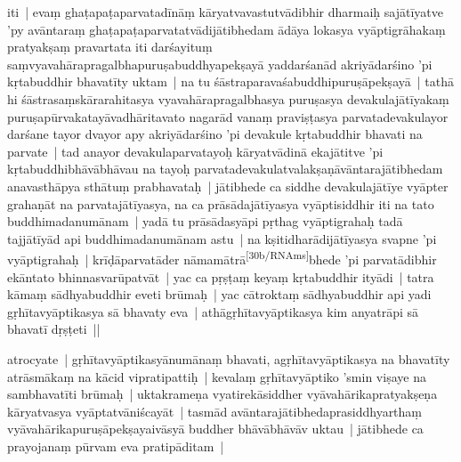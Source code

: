 \documentclass[article,a4paper]{memoir}
\begin{document}
	  \pstart iti | evaṃ ghaṭapaṭaparvatadī\-nā\-ṃ kā\-ryatvavastutvā\-dibhir dharmaiḥ sajā\-tī\-yatve 'py avā\-ntaraṃ ghaṭapaṭaparvatatvā\-dijā\-tibhedam ā\-dā\-ya lokasya vyā\-ptigrā\-hakaṃ pratyakṣaṃ pravartata iti darśayituṃ saṃvyavahā\-rapragalbhapuruṣabuddhyapekṣayā\- yaddarśanā\-d akriyā\-darśino 'pi kṛtabuddhir bhavatī\-ty uktam | na tu śā\-straparavaśabuddhipuruṣā\-pekṣayā\- | tathā\- hi śā\-strasaṃskā\-rarahitasya vyavahā\-rapragalbhasya puruṣasya devakulajā\-tī\-yakaṃ puruṣapū\-rvakatayā\-vadhā\-ritavato nagarā\-d vanaṃ praviṣṭasya parvatadevakulayor darśane tayor dvayor apy akriyā\-darśino 'pi devakule kṛtabuddhir bhavati na parvate | tad anayor devakulaparvatayoḥ kā\-ryatvā\-dinā\- ekajā\-titve 'pi kṛtabuddhibhā\-vā\-bhā\-vau na tayoḥ parvatadevakulatvalakṣaṇā\-vā\-ntarajā\-tibhedam anavasthā\-pya sthā\-tuṃ prabhavataḥ | jā\-tibhede ca siddhe devakulajā\-tī\-ye vyā\-pter grahaṇā\-t na parvatajā\-tī\-yasya, na ca prā\-sā\-dajā\-tī\-yasya vyā\-ptisiddhir iti na tato buddhimadanumā\-nam | yadā\- tu prā\-sā\-dasyā\-pi pṛthag vyā\-ptigrahaḥ tadā\- tajjā\-tī\-yā\-d api buddhimadanumā\-nam astu | na kṣitidharā\-dijā\-tī\-yasya svapne 'pi vyā\-ptigrahaḥ | krī\-ḍā\-parvatā\-der nā\-mamā\-trā\-\leavevmode\textsuperscript{\rmlatinfont\tiny [30b/RNAms]}\label{RNAms_30b}bhede 'pi parvatā\-dibhir ekā\-ntato bhinnasvarū\-patvā\-t | \label{sarit__ratnakīrtinibandhāvali__146084}yac ca pṛṣṭaṃ keyaṃ kṛtabuddhir ityā\-di | tatra kā\-maṃ sā\-dhyabuddhir eveti brū\-maḥ | yac cā\-troktaṃ sā\-dhyabuddhir api yadi gṛhī\-tavyā\-ptikasya sā\- bhavaty eva | athā\-gṛhī\-tavyā\-ptikasya kim anyatrā\-pi sā\- bhavatī\- dṛṣṭeti ||
	\pend
      

	  \pstart atrocyate | gṛhī\-tavyā\-ptikasyā\-numā\-naṃ bhavati, agṛhī\-tavyā\-ptikasya na bhavatī\-ty atrā\-smā\-kaṃ na kā\-cid vipratipattiḥ | kevalaṃ gṛhī\-tavyā\-ptiko 'smin viṣaye na sambhavatī\-ti brū\-maḥ |\label{sarit__ratnakīrtinibandhāvali__146582} uktakrameṇa vyatirekā\-siddher vyā\-vahā\-rikapratyakṣeṇa kā\-ryatvasya vyā\-ptatvā\-niścayā\-t | tasmā\-d avā\-ntarajā\-tibhedaprasiddhyarthaṃ vyā\-vahā\-rikapuruṣā\-pekṣayaivā\-syā\- buddher bhā\-vā\-bhā\-vā\-v uktau | jā\-tibhede ca prayojanaṃ pū\-rvam eva pratipā\-ditam |
	\pend
      
\end{document}
